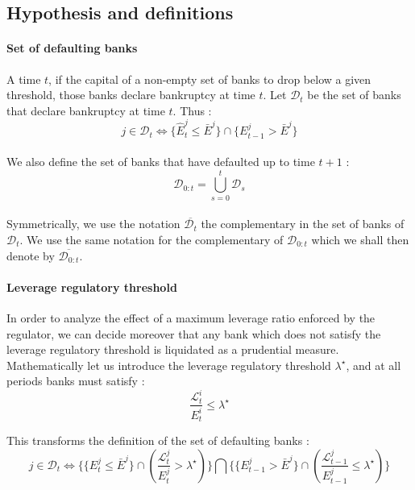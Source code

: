 \documentclass{article}
\begin{document}
\subsection{Hypothesis and definitions}

\paragraph{Set of defaulting banks}
A time $t$, if the capital of a non-empty set of banks to drop below a given threshold, those banks declare bankruptcy at time $t$. Let $\mathcal{D}_t$ be the set of banks that declare bankruptcy at time $t$. Thus : $$j \in \mathcal{D}_{t} \Leftrightarrow \{ \widehat{E}_{t}^j \leq \bar{E}^j \} \cap \{ E_{t-1}^j > \bar{E}^j \} $$

\paragraph{}    
We also define the set of banks that have defaulted up to time $t+1$ :
$$\mathcal{D}_{0:t} = \bigcup_{s=0}^{t} \mathcal{D}_s $$

\paragraph{}
Symmetrically, we use the notation $\overline{\mathcal{D}_{t}}$ the complementary in the set of banks of $\mathcal{D}_{t}$. We use the same notation for the complementary of $\mathcal{D}_{0:t}$ which we shall then denote by $\overline{\mathcal{D}_{0:t}}$.

\paragraph{Leverage regulatory threshold}
In order to analyze the effect of a maximum leverage ratio enforced by the regulator, we can decide moreover that any bank which does not satisfy the leverage regulatory threshold is liquidated as a prudential measure. Mathematically let us introduce the leverage regulatory threshold $\lambda^{\star}$, and at all periods banks must satisfy : 
$$\frac{\mathcal{L}^i_t}{E^i_t} \leq \lambda^{\star} $$

This transforms the definition of the set of defaulting banks : 
$$j \in \mathcal{D}_{t} \Leftrightarrow \bigg\{ \{ E_t^j \leq \bar{E}^j \}\cap \left( \frac{\mathcal{L}^j_t}{E^j_t} > \lambda^{\star} \right) \bigg\}  \bigcap \bigg\{ \{ E_{t-1}^j > \bar{E}^j \}\cap \left( \frac{\mathcal{L}^j_{t-1}}{E^j_{t-1}} \leq \lambda^{\star} \right) \bigg\}$$
\end{document}
